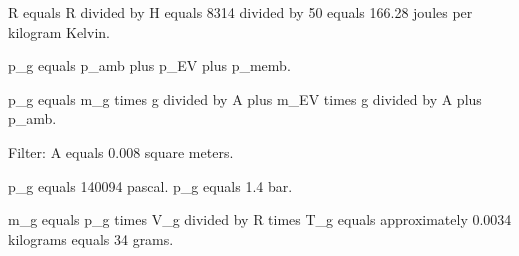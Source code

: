 R equals R divided by H equals 8314 divided by 50 equals 166.28 joules per kilogram Kelvin.  

p_g equals p_amb plus p_EV plus p_memb.  

p_g equals m_g times g divided by A plus m_EV times g divided by A plus p_amb.  

Filter: A equals 0.008 square meters.  

p_g equals 140094 pascal. p_g equals 1.4 bar.  

m_g equals p_g times V_g divided by R times T_g equals approximately 0.0034 kilograms equals 34 grams.